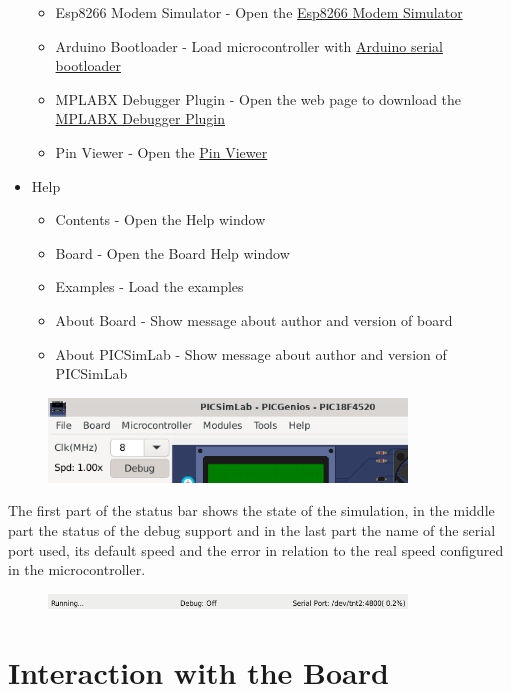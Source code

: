 \begin{itemize}
\begin{itemize}
 \item Esp8266 Modem Simulator -  Open the \hyperlink{def:espmsim}{Esp8266 Modem Simulator}
 \item Arduino Bootloader - Load microcontroller with \hyperlink{def:aboot}{Arduino serial bootloader} 
 \item MPLABX Debugger Plugin - Open the web page to download the \hyperlink{def:mpdebug}{MPLABX Debugger Plugin} 
 \item Pin Viewer - Open the \hyperlink{def:pinv}{Pin Viewer} 
\end{itemize}
\item Help 
\begin{itemize}
 \item Contents - Open the Help window
 \item Board - Open the Board Help window
 \item Examples - Load the examples
 \item About Board - Show message about author and version of board
 \item About PICSimLab - Show message about author and version of PICSimLab
\end{itemize}
\end{itemize}


\begin{figure}[H]
\center
\includegraphics[width=0.85\textwidth]{img/int1.png} 
\end{figure} 

The first part of the status bar shows the state of the simulation, in the middle part the status of the debug support and in the last part the name of the serial port used, its default speed and the error in relation to the real speed configured in the microcontroller.

\begin{figure}[H]
\center
\includegraphics[width=0.85\textwidth]{img/int2.png} 
\end{figure} 


\section{Interaction with the Board}

